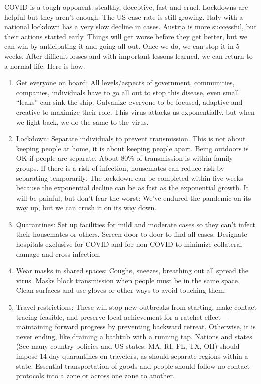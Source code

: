 \documentclass[onecolumn,journal]{IEEEtran}
\begin{document}
\begin{multicols}{2}
COVID is a tough opponent: stealthy, deceptive, fast and cruel. Lockdowns are helpful but they aren't enough. The US case rate is still growing. Italy with a national lockdown has a very slow decline in cases. Austria is more successful, but their actions started early. Things will get worse before they get better, but we can win by anticipating it and going all out. Once we do, we can stop it in 5 weeks. After difficult losses and with important lessons learned, we can return to a normal life. Here is how.

\begin{enumerate}
\item Get everyone on board: All levels/aspects of government, communities, companies, individuals have to go all out to stop this disease, even small ``leaks'' can sink the ship. Galvanize everyone to be focused, adaptive and creative to maximize their role. This virus attacks us exponentially, but when we fight back, we do the same to the virus.
\item Lockdown: Separate individuals to prevent transmission. This is not about keeping people at home, it is about keeping people apart. Being outdoors is OK if people are separate. About 80\% of transmission is within family groups. If there is a risk of infection, housemates can reduce risk by separating temporarily. The lockdown can be completed within five weeks because the exponential decline can be as fast as the exponential growth. It will be painful, but don't fear the worst: We've endured the pandemic on its way up, but we can crush it on its way down. %
\item Quarantines: Set up facilities for mild and moderate cases so they can't infect their housemates or others. Screen door to door to find all cases. Designate hospitals exclusive for COVID and for non-COVID to minimize collateral damage and cross-infection.
\item Wear masks in shared spaces: Coughs, sneezes, breathing out all spread the virus. Masks block transmission when people must be in the same space. Clean surfaces and use gloves or other ways to avoid touching them. 
\item Travel restrictions: These will stop new outbreaks from starting, make contact tracing feasible, and preserve local achievement for a ratchet effect---maintaining forward progress by preventing backward retreat. Otherwise, it is never ending, like draining a bathtub with a running tap. Nations and states (See many country policies and US states: MA, RI, FL, TX, OH) should impose 14 day quarantines on travelers, as should separate regions within a state. Essential transportation of goods and people should follow no contact protocols into a zone or across one zone to another.

\end{enumerate}
\end{multicols}
\end{document}
